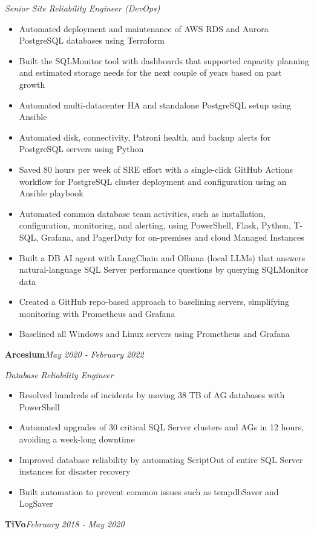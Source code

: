 \documentclass[10pt,a4paper]{article}
\begin{document}
\textit{Senior Site Reliability Engineer (DevOps)}\\[-5pt]
\begin{itemize}
  \item Automated deployment and maintenance of AWS RDS and Aurora PostgreSQL databases using Terraform
  \item Built the SQLMonitor tool with dashboards that supported capacity planning and estimated storage needs for the next couple of years based on past growth
  \item Automated multi-datacenter HA and standalone PostgreSQL setup using Ansible
  \item Automated disk, connectivity, Patroni health, and backup alerts for PostgreSQL servers using Python
  \item Saved 80 hours per week of SRE effort with a single-click GitHub Actions workflow for PostgreSQL cluster deployment and configuration using an Ansible playbook
  \item Automated common database team activities, such as installation, configuration, monitoring, and alerting, using PowerShell, Flask, Python, T-SQL, Grafana, and PagerDuty for on-premises and cloud Managed Instances
  \item Built a DB AI agent with LangChain and Ollama (local LLMs) that answers natural-language SQL Server performance questions by querying SQLMonitor data
  \item Created a GitHub repo-based approach to baselining servers, simplifying monitoring with Prometheus and Grafana
  \item Baselined all Windows and Linux servers using Prometheus and Grafana
\end{itemize}
\vspace{14.7pt}
\noindent\textbf{Arcesium}\hfill \textit{May 2020 - February 2022}

\textit{Database Reliability Engineer}\\[-5pt]
\begin{itemize}
  \item Resolved hundreds of incidents by moving 38 TB of AG databases with PowerShell
  \item Automated upgrades of 30 critical SQL Server clusters and AGs in 12 hours, avoiding a week-long downtime
  \item Improved database reliability by automating ScriptOut of entire SQL Server instances for disaster recovery
  \item Built automation to prevent common issues such as tempdbSaver and LogSaver
\end{itemize}
\vspace{14.7pt}
\noindent\textbf{TiVo}\hfill \textit{February 2018 - May 2020}
\end{document}
